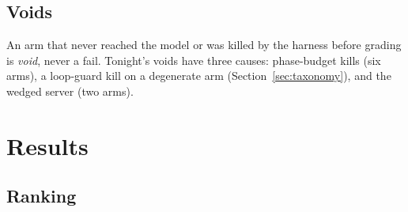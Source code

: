\subsection{Voids}

An arm that never reached the model or was killed by the harness before grading is \emph{void}, never a fail.
Tonight's voids have three causes: phase-budget kills (six arms), a loop-guard kill on a degenerate arm
(Section~\ref{sec:taxonomy}), and the wedged server (two arms).

\section{Results}\label{sec:results}

\subsection{Ranking}\label{sec:ranking}

